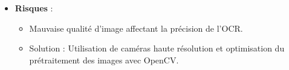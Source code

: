 \begin{itemize}
\begin{itemize}
\begin{itemize}
                \item Les images sont traitées avec une latence inférieure à 1 seconde par frame dans 100\% des tests.
                \item Le pipeline est compatible avec les moniteurs Mindray et Edan, testé sur au moins 5 scénarios différents.
            \end{itemize}
        \item \textbf{Risques} :
            \begin{itemize}
                \item Mauvaise qualité d'image affectant la précision de l'OCR.
                \item Solution : Utilisation de caméras haute résolution et optimisation du prétraitement des images avec OpenCV.
            \end{itemize}
    \end{itemize}


\end{itemize}
